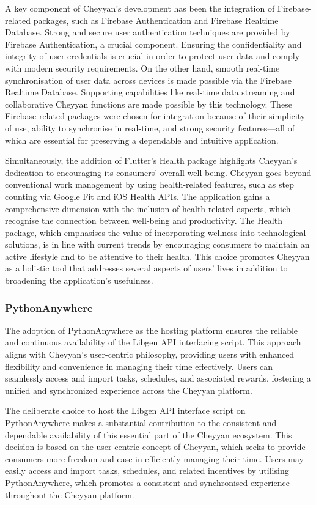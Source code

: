 \documentclass{l4proj}
\begin{document}
A key component of Cheyyan's development has been the integration of Firebase-related packages, such as Firebase Authentication and Firebase Realtime Database. Strong and secure user authentication techniques are provided by Firebase Authentication, a crucial component. Ensuring the confidentiality and integrity of user credentials is crucial in order to protect user data and comply with modern security requirements. On the other hand, smooth real-time synchronisation of user data across devices is made possible via the Firebase Realtime Database. Supporting capabilities like real-time data streaming and collaborative Cheyyan functions are made possible by this technology. These Firebase-related packages were chosen for integration because of their simplicity of use, ability to synchronise in real-time, and strong security features—all of which are essential for preserving a dependable and intuitive application.

Simultaneously, the addition of Flutter's Health package highlights Cheyyan's dedication to encouraging its consumers' overall well-being. Cheyyan goes beyond conventional work management by using health-related features, such as step counting via Google Fit and iOS Health APIs. The application gains a comprehensive dimension with the inclusion of health-related aspects, which recognise the connection between well-being and productivity. The Health package, which emphasises the value of incorporating wellness into technological solutions, is in line with current trends by encouraging consumers to maintain an active lifestyle and to be attentive to their health. This choice promotes Cheyyan as a holistic tool that addresses several aspects of users' lives in addition to broadening the application's usefulness.\\

\subsubsection{PythonAnywhere}
The adoption of PythonAnywhere as the hosting platform ensures the reliable and continuous availability of the Libgen API interfacing script. This approach aligns with Cheyyan's user-centric philosophy, providing users with enhanced flexibility and convenience in managing their time effectively. Users can seamlessly access and import tasks, schedules, and associated rewards, fostering a unified and synchronized experience across the Cheyyan platform.

The deliberate choice to host the Libgen API interface script on PythonAnywhere makes a substantial contribution to the consistent and dependable availability of this essential part of the Cheyyan ecosystem. This decision is based on the user-centric concept of Cheyyan, which seeks to provide consumers more freedom and ease in efficiently managing their time. Users may easily access and import tasks, schedules, and related incentives by utilising PythonAnywhere, which promotes a consistent and synchronised experience throughout the Cheyyan platform.
\end{document}
